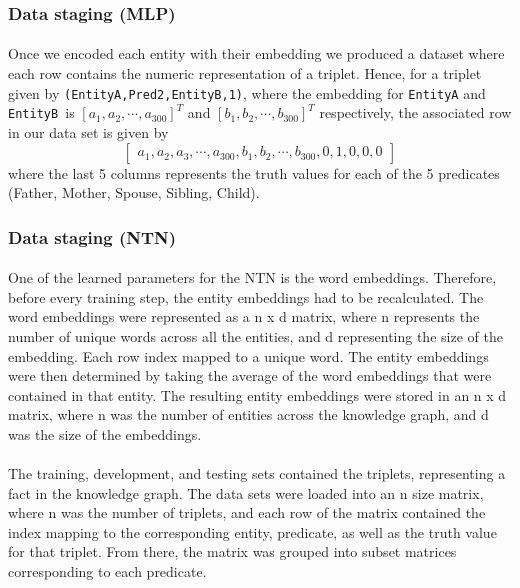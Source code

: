 \documentclass[11.5pt]{article}
\newcommand{\Mat}[1]{\left[\begin{matrix} #1 \end{matrix}\right]}
\begin{document}
\subsubsection{Data staging (MLP)}
\paragraph{}  Once we encoded each entity with their embedding we produced a dataset where each row contains the numeric representation of a triplet. Hence, for a triplet given by \texttt{(EntityA,Pred2,EntityB,1)}, where the embedding for \texttt{EntityA} and \texttt{EntityB }is $[a_1,a_2,\cdots,a_{300}]^T$ and $[b_1,b_2,\cdots,b_{300}]^T$ respectively, the associated row in our data set is given by
$$ \Mat{a_1,a_2,a_3,\cdots,a_{300},b_1,b_2,\cdots,b_{300},0,1,0,0,0} $$
where the last 5 columns represents the truth values for each of the 5 predicates (Father, Mother, Spouse, Sibling, Child).

\subsubsection{Data staging (NTN)}
\paragraph{}  One of the learned parameters for the NTN is the word embeddings. Therefore, before every training step, the entity embeddings had to be recalculated. The word embeddings were represented as a n x d matrix, where n represents the number of unique words across all the entities, and d representing the size of the embedding. Each row index mapped to a unique word. The entity embeddings were then determined by taking the average of the word embeddings that were contained in that entity. The resulting entity embeddings were stored in an n x d matrix, where n was the number of entities across the knowledge graph, and d was the size of the embeddings.

\paragraph{} The training, development, and testing sets contained the triplets, representing a fact in the knowledge graph. The data sets were loaded into an n size matrix, where n was the number of triplets, and each row of the matrix contained the index mapping to the corresponding entity, predicate, as well as the truth value for that triplet. From there, the matrix was grouped into subset matrices corresponding to each predicate.
\end{document}
